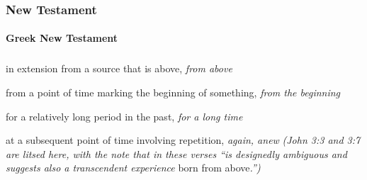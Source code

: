 	\subsubsection{New Testament} %
		\label{AGAIN-NT}
	
			
	
			
			
		\paragraph{Greek New Testament} %
			\label{AGAIN-GREEK}
		
			\subparagraph{\texorpdfstring{}{}}
				\label{ANOTHEN}
			
				\begin{compactdesc}
					\item[BDAG 80b] \textbf{}
						\begin{compactitem}
							\item[1] in extension from a source that is above, \textit{from above}
							\item[2] from a point of time marking the beginning of something, \textit{from the beginning}
							\item[3] for a relatively long period in the past, \textit{for a long time}
							\item[4] at a subsequent point of time involving repetition, \textit{again, anew} \textit{(John 3:3 and 3:7 are litsed here, with the note that  in these verses ``is designedly ambiguous and suggests also a transcendent experience} born from above\textit{.'')}
						\end{compactitem}
					\item[LSJ , PDF ] \textbf{}
						\begin{compactitem}
							\item 
						\end{compactitem}
				\end{compactdesc}
				
